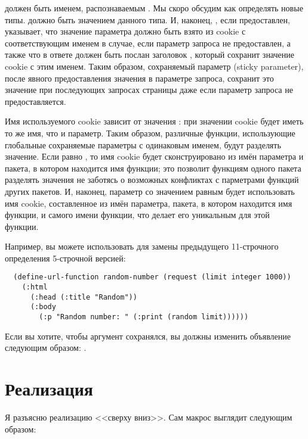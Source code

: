 должен быть именем, распознаваемым . Мы скоро
обсудим как определять новые типы.  должно быть значением данного
типа. И, наконец, , если предоставлен, указывает, что значение параметра
должно быть взято из cookie с соответствующим именем в случае, если параметр запроса не
предоставлен, а также что в ответе должен быть послан заголовок , который
сохранит значение cookie с этим именем. Таким образом, сохраняемый параметр (sticky
parameter), после явного предоставления значения в параметре запроса, сохранит это
значение при последующих запросах страницы даже если параметр запроса не предоставляется.

Имя используемого cookie зависит от значения : при значении 
cookie будет иметь то же имя, что и параметр. Таким образом, различные функции,
использующие глобальные сохраняемые параметры с одинаковым именем, будут разделять
значение. Если  равно , то имя cookie будет сконструировано
из имён параметра и пакета, в котором находится имя функции; это позволит функциям одного
пакета разделять значения не заботясь о возможных конфликтах с парметрами функций других
пакетов. И, наконец, параметр со значением  равным  будет
использовать имя cookie, составленное из имён параметра, пакета, в котором находится имя
функции, и самого имени функции, что делает его уникальным для этой функции.

Например, вы можете использовать  для замены предыдущего
11-строчного определения  5-строчной версией:

\begin{lstlisting}
  (define-url-function random-number (request (limit integer 1000))
    (:html
      (:head (:title "Random"))
      (:body
        (:p "Random number: " (:print (random limit))))))
\end{lstlisting}

Если вы хотите, чтобы аргумент  сохранялся, вы должны изменить объявление
 следующим образом: .

\section{Реализация}

Я разъясню реализацию  <<сверху вниз>>. Сам макрос выглядит
следующим образом:

